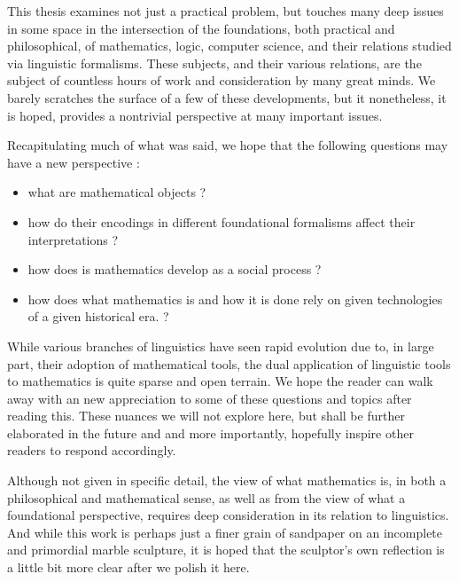 This thesis examines not just a practical problem, but touches many deep issues in
some space in the intersection of the foundations, both practical and
philosophical, of mathematics, logic, computer science, and their relations
studied via linguistic formalisms. These subjects, and their various relations,
are the subject of countless hours of work and consideration by many great
minds. We barely scratches the surface of a few of these developments,
but it nonetheless, it is hoped, provides a nontrivial perspective at many
important issues.

Recapitulating much of what was said, we hope that the following questions may
have a new perspective :

\begin{itemize}

\item what are mathematical objects ?
\item how do their encodings in different foundational formalisms affect their
  interpretations ?
\item how does is mathematics develop as a social process ?
\item how does what mathematics is and how it is done rely on given technologies
  of a given historical era. ?
  
\end{itemize}

While various branches of linguistics have seen rapid evolution due to, in large
part, their adoption of mathematical tools, the dual application of linguistic
tools to mathematics is quite sparse and open terrain. We hope the reader can
walk away with an new appreciation to some of these questions and topics after
reading this. These nuances we will not explore here, but shall be further
elaborated in the future and and more importantly, hopefully inspire other
readers to respond accordingly.

Although not given in specific detail, the view of what mathematics is, in both
a philosophical and mathematical sense, as well as from the view of what a
foundational perspective, requires deep consideration in its relation to
linguistics. And while this work is perhaps just a finer grain of sandpaper on
an incomplete and primordial marble sculpture, it is hoped that the sculptor's
own reflection is a little bit more clear after we polish it here.
